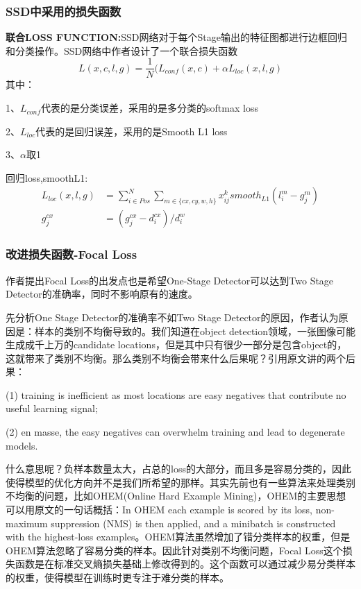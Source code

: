 \subsubsection{SSD中采用的损失函数}
\textbf{联合LOSS FUNCTION:}SSD网络对于每个Stage输出的特征图都进行边框回归和分类操作。SSD网络中作者设计了一个联合损失函数
\[
	L(x,c,l,g) = \frac{1}{N}(L_{conf}(x,c) + \alpha L_{loc}(x,l,g)
\]
其中：

 1、$L_{conf}$代表的是分类误差，采用的是多分类的softmax loss
 
 2、$L_{loc}$代表的是回归误差，采用的是Smooth L1 loss
 
 3、$\alpha$取1
 
 回归loss,smoothL1:
\begin{align*}
 L_{loc}(x,l,g) &= \sum _{i \in Pos} ^{N} \sum_{m \in \{cx,cy,w,h\}} x_{ij}^k smooth _{L1} (l_i ^m - g_j ^m) \\
 g_j^{cx} &= \left( g_j ^{cx} - d_i ^{cx} \right) / d_i ^w 
\end{align*}

\subsubsection{改进损失函数-Focal Loss}
作者提出Focal Loss的出发点也是希望One-Stage Detector可以达到Two Stage Detector的准确率，同时不影响原有的速度。

先分析One Stage Detector的准确率不如Two Stage Detector的原因，作者认为原因是：样本的类别不均衡导致的。我们知道在object detection领域，一张图像可能生成成千上万的candidate locations，但是其中只有很少一部分是包含object的，这就带来了类别不均衡。那么类别不均衡会带来什么后果呢？引用原文讲的两个后果：

(1) training is inefficient as most locations are easy negatives that contribute no useful learning signal; 

(2) en masse, the easy negatives can overwhelm training and lead to degenerate models. \cite{focal-loss}

什么意思呢？负样本数量太大，占总的loss的大部分，而且多是容易分类的，因此使得模型的优化方向并不是我们所希望的那样。其实先前也有一些算法来处理类别不均衡的问题，比如OHEM(Online Hard Example Mining)\cite{ohem}，OHEM的主要思想可以用原文的一句话概括：In OHEM each example is scored by its loss, non-maximum suppression (NMS) is then applied, and a minibatch is constructed with the highest-loss examples。\cite{ohem}OHEM算法虽然增加了错分类样本的权重，但是OHEM算法忽略了容易分类的样本。因此针对类别不均衡问题，Focal Loss这个损失函数是在标准交叉熵损失基础上修改得到的。这个函数可以通过减少易分类样本的权重，使得模型在训练时更专注于难分类的样本。

